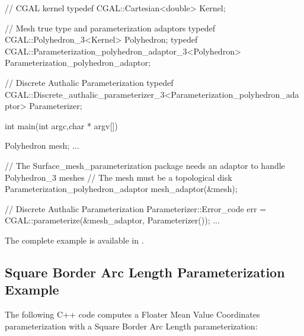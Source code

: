 \begin{ccExampleCode}

// CGAL kernel
typedef CGAL::Cartesian<double>                         Kernel;

// Mesh true type and parameterization adaptors
typedef CGAL::Polyhedron_3<Kernel>                      Polyhedron;
typedef CGAL::Parameterization_polyhedron_adaptor_3<Polyhedron>
                                                        Parameterization_polyhedron_adaptor;

// Discrete Authalic Parameterization
typedef CGAL::Discrete_authalic_parameterizer_3<Parameterization_polyhedron_adaptor>
                                                        Parameterizer;

int main(int argc,char * argv[])
{
    Polyhedron mesh;
    ...

    // The Surface_mesh_parameterization package needs an adaptor to handle Polyhedron_3 meshes
    // The mesh must be a topological disk
    Parameterization_polyhedron_adaptor mesh_adaptor(&mesh);

    // Discrete Authalic Parameterization
    Parameterizer::Error_code err = CGAL::parameterize(&mesh_adaptor, Parameterizer());
    ...
}

\end{ccExampleCode}

The complete example is available in
.


\subsection{Square Border Arc Length Parameterization Example}

The following C++ code computes a Floater Mean Value Coordinates
parameterization with a Square Border Arc Length parameterization:

